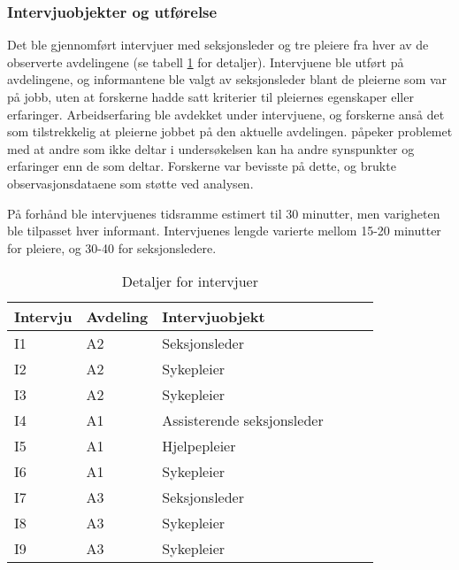 \subsubsection{Intervjuobjekter og utførelse}
Det ble gjennomført intervjuer med seksjonsleder og tre pleiere fra hver av de observerte avdelingene (se tabell \ref{detaljerintervju} for detaljer). Intervjuene ble utført på avdelingene, og informantene ble valgt av seksjonsleder blant de pleierne som var på jobb, uten at forskerne hadde satt kriterier til pleiernes egenskaper eller erfaringer. Arbeidserfaring ble avdekket under intervjuene, og forskerne anså det som tilstrekkelig at pleierne jobbet på den aktuelle avdelingen. \citet{Tjora} påpeker problemet med at andre som ikke deltar i undersøkelsen kan ha andre synspunkter og erfaringer enn de som deltar. Forskerne var bevisste på dette, og brukte observasjonsdataene som støtte ved analysen.
 
\noindent
På forhånd ble intervjuenes tidsramme estimert til 30 minutter, men varigheten ble tilpasset hver informant. Intervjuenes lengde varierte mellom 15-20 minutter for pleiere, og 30-40 for seksjonsledere.
 
\begin{table}[H]\centering
    \begin{tabular}{ |l|l|l|l|l|l| }
    \hline
    Intervju & Avdeling & Intervjuobjekt \\ \hline
       I1 & A2 & Seksjonsleder \\ \hline
       I2 & A2 & Sykepleier \\ \hline
       I3 & A2 & Sykepleier \\ \hline
       I4 & A1 & Assisterende seksjonsleder \\ \hline
       I5 & A1 & Hjelpepleier \\ \hline
       I6 & A1 & Sykepleier \\ \hline
       I7 & A3 & Seksjonsleder \\ \hline
       I8 & A3 & Sykepleier \\ \hline
       I9 & A3 & Sykepleier \\ \hline
    \end{tabular}
    \caption {Detaljer for intervjuer}
    \label{detaljerintervju}
\end{table}

